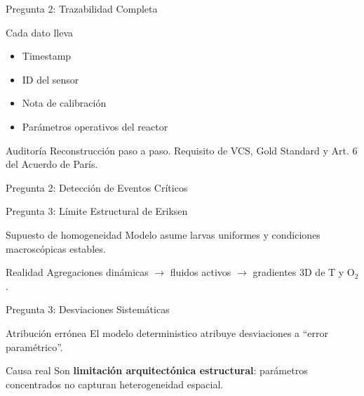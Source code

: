 \documentclass[aspectratio=169, 11pt]{beamer}
\begin{document}
\begin{frame}{Pregunta 2: Trazabilidad Completa}
\begin{block}{Cada dato lleva}
\footnotesize
\begin{itemize}
    \item Timestamp
    \item ID del sensor
    \item Nota de calibración
    \item Parámetros operativos del reactor
\end{itemize}
\end{block}
\begin{exampleblock}{Auditoría}
\footnotesize
Reconstrucción paso a paso. Requisito de VCS, Gold Standard y Art. 6 del Acuerdo de París.
\end{exampleblock}
\end{frame}

\begin{frame}{Pregunta 2: Detección de Eventos Críticos}
\centering
{}
\end{frame}

\begin{frame}{Pregunta 3: Límite Estructural de Eriksen}
\begin{alertblock}{Supuesto de homogeneidad}
\footnotesize
Modelo asume larvas uniformes y condiciones macroscópicas estables.
\end{alertblock}
\begin{block}{Realidad}
\footnotesize
Agregaciones dinámicas $\rightarrow$ fluidos activos $\rightarrow$ gradientes 3D de T y O$_2$.
\end{block}
\end{frame}

\begin{frame}{Pregunta 3: Desviaciones Sistemáticas}
\begin{block}{Atribución errónea}
\footnotesize
El modelo deterministico atribuye desviaciones a ``error paramétrico''.
\end{block}
\begin{alertblock}{Causa real}
\footnotesize
Son \textbf{limitación arquitectónica estructural}: parámetros concentrados no capturan heterogeneidad espacial.
\end{alertblock}
\end{frame}
\end{document}
